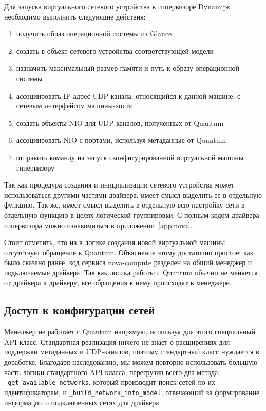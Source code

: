 Для запуска виртуального сетевого устройства в гипервизоре Dynamips необходимо выполнить 
следующие действия:
\begin{enumerate}
    \item получить образ операционной системы из Glance
    \item создать в объект сетевого устройства соответствующей модели
    \item назначить максимальный размер памяти и путь к образу операционной системы
    \item ассоциировать IP-адрес UDP-канала, относящийся к данной машине, с сетевым интерфейсом
             машины-хоста
    \item создать объекты NIO для UDP-каналов, полученных от Quantum
    \item ассоциировать NIO с портами, используя метаданные от Quantum
    \item отправить команду на запуск сконфигурированной виртуальной машины гипервизору
\end{enumerate}
Так как процедура создания и инициализации сетевого устройства может использоваться другими
частями драйвера, имеет смысл выделить ее в отдельную функцию. Так же, имеет смысл выделить
в отдельную всю настройку сети в отдельную функцию в целях логической группировки.
С полным кодом драйвера гипервизора можно ознакомиться в приложении~\ref{app:nova}.

Стоит отметить, что на в логике создания новой виртуальной машины отсутствует 
обращение к Quantum. Объяснение этому достаточно простое: как было сказано ранее,
код сервиса nova-compute разделен на общий менеджер и подключаемые драйвера.
Так как логика работы с Quantum обычно не меняется от драйвера к драйверу, все обращения
к нему происходят в менеджере.

\subsection{Доступ к конфигурации сетей}

Менеджер не работает с Quantum напрямую, используя для этого специальный
API-класс. Стандартная реализация ничего не знает о расширениях для поддержки метаданных
и UDP-каналов, поэтому стандартный класс нуждается в доработке. Благодаря наследованию,
мы можем повторно использовать большую часть логики стандартного API-класса, перегрузив
всего два метода: \verb`_get_available_networks`,  который производит поиск сетей по их 
идентификаторам, и \verb`_build_network_info_model`, отвечающий за формирование
информации о подключенных сетях для драйвера.

